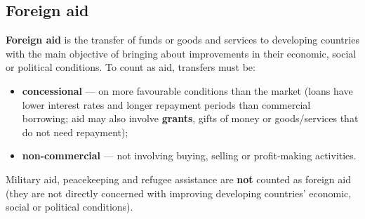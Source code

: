 \documentclass[a4paper,12pt]{article}
\newcommand{\needbold}[1]{\textcolor{red!70!black}{\textbf{#1}}}
\begin{document}
\subsection{Foreign aid}
\needbold{Foreign aid} is the transfer of funds or goods and services to developing countries with the main objective of bringing about improvements in their economic, social or political conditions. To count as aid, transfers must be:
\begin{itemize}
  \item \textbf{concessional} --- on more favourable conditions than the market (loans have lower interest rates and longer repayment periods than commercial borrowing; aid may also involve \textbf{grants}, gifts of money or goods/services that do not need repayment);
  \item \textbf{non-commercial} --- not involving buying, selling or profit-making activities.
\end{itemize}
Military aid, peacekeeping and refugee assistance are \textbf{not} counted as foreign aid (they are not directly concerned with improving developing countries' economic, social or political conditions).
\end{document}
